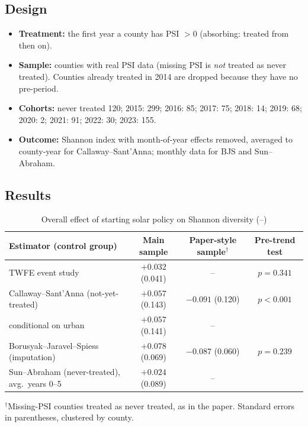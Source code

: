 \documentclass[11pt]{article}
\begin{document}
\subsection{Design}
\begin{itemize}
\item \textbf{Treatment:} the first year a county has PSI $>0$ (absorbing: treated from then on).
\item \textbf{Sample:} counties with real PSI data (missing PSI is \emph{not} treated as never treated). Counties already treated in 2014 are dropped because they have no pre-period.
\item \textbf{Cohorts:} never treated 120; 2015: 299; 2016: 85; 2017: 75; 2018: 14; 2019: 68; 2020: 2; 2021: 91; 2022: 30; 2023: 155.
\item \textbf{Outcome:} Shannon index with month-of-year effects removed, averaged to county-year for Callaway--Sant'Anna; monthly data for BJS and Sun--Abraham.
\end{itemize}

\subsection{Results}
\begin{table}[H]\centering\small
\caption{Overall effect of starting solar policy on Shannon diversity (--)}
\begin{tabularx}{\linewidth}{>{\raggedright\arraybackslash}Xccc}
\toprule
Estimator (control group) & Main sample & Paper-style sample$^\dagger$ & Pre-trend test\\
\midrule
TWFE event study & $+0.032$ (0.041) & -- & $p=0.341$\\
Callaway--Sant'Anna (not-yet-treated) & $+0.057$ (0.143) & $-0.091$ (0.120) & $p<0.001$\\
\quad conditional on urban & $+0.057$ (0.141) & -- & \\
Borusyak--Jaravel--Spiess (imputation) & $+0.078$ (0.069) & $-0.087$ (0.060) & $p=0.239$\\
Sun--Abraham (never-treated), avg.\ years 0--5 & $+0.024$ (0.089) & -- & \\
\bottomrule
\end{tabularx}
\par\smallskip\raggedright\footnotesize $^\dagger$Missing-PSI counties treated as never treated, as in the paper. Standard errors in parentheses, clustered by county.
\end{table}
\end{document}
